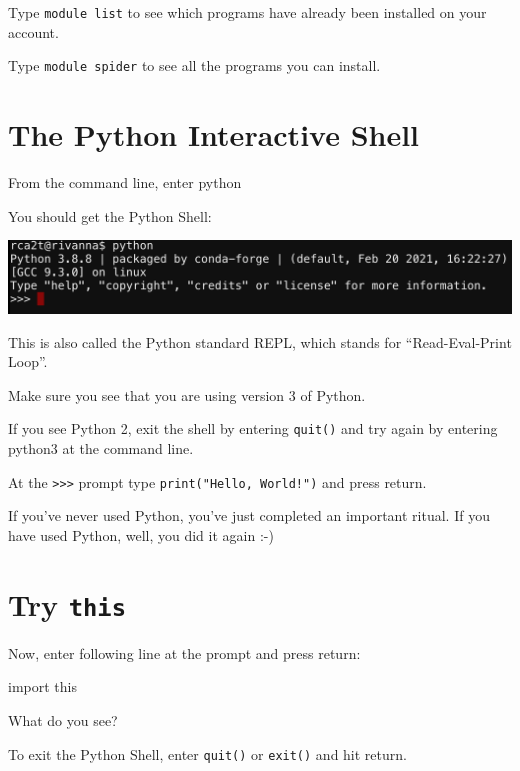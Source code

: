 \documentclass[
  letterpaper,
  DIV=11,
  numbers=noendperiod]{scrreprt}
\newenvironment{Shaded}{\begin{snugshade}}{\end{snugshade}}
\newcommand{\ImportTok}[1]{\textcolor[rgb]{0.00,0.46,0.62}{#1}}
\newcommand{\NormalTok}[1]{\textcolor[rgb]{0.00,0.23,0.31}{#1}}
\begin{document}
Type \texttt{module\ list} to see which programs have already been
installed on your account.

Type \texttt{module\ spider} to see all the programs you can install.

\hypertarget{the-python-interactive-shell}{%
\section{The Python Interactive
Shell}\label{the-python-interactive-shell}}

From the command line, enter python

You should get the Python Shell:

\includegraphics{modules/M02_BasicPython/../../media/python-prompt.png}

This is also called the Python standard REPL, which stands for
``Read-Eval-Print Loop''.

Make sure you see that you are using version 3 of Python.

If you see Python 2, exit the shell by entering \texttt{quit()} and try
again by entering python3 at the command line.

At the \texttt{\textgreater{}\textgreater{}\textgreater{}} prompt type
\texttt{print("Hello,\ World!")} and press return.

If you've never used Python, you've just completed an important ritual.
If you have used Python, well, you did it again :-)

\hypertarget{try-this}{%
\section{\texorpdfstring{Try \texttt{this}}{Try this}}\label{try-this}}

Now, enter following line at the prompt and press return:

\begin{Shaded}
\begin{Highlighting}[]
\ImportTok{import}\NormalTok{ this}
\end{Highlighting}
\end{Shaded}

What do you see?

To exit the Python Shell, enter \texttt{quit()} or \texttt{exit()} and
hit return.
\end{document}
